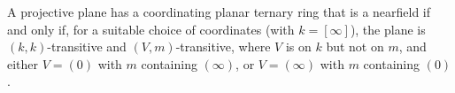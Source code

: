 A projective plane has a coordinating planar ternary ring that is a nearfield if and only if, for a suitable choice of coordinates (with $k = [\infty]$), the plane is $(k,k)$-transitive and $(V,m)$-transitive, where $V$ is on $k$ but not on $m$, and either $V = (0)$ with $m$ containing $(\infty)$, or $V = (\infty)$ with $m$ containing $(0)$.
